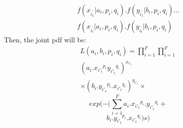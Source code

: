 \documentclass[]{article}
\begin{document}
\begin{multline*}
f({{x_{i_{1}^{'}}}|a_i,p_i,q_i}).f({{y_{i_{1}^{'}}}|b_i,p_i,q_i}){\dots}\\f({{x_{i_{t}^{'}}}|a_i,p_i,q_i}).f({{y_{i_{t}^{'}}}|b_i,p_i,q_i})
    \end{multline*}
Then, the joint pdf will be:
\begin{multline*}\label{e7}
     L(a_i,b_i,p_i,q_i)=
     {\prod_{i=1}^{F}}{\prod_{i=1}^{F}}\\(a_i.{x_{i'_t}}^{p_i}{y_{i'_t}}^{q_i})^{\Dot{x}_{i'_t}}\\{\times}(b_i.{y_{i'_t}}^{p_i}.{x_{i'_t}}^{q_i})^{\Dot{y}_{i'_t}}{\times}
      \nonumber
\end{multline*}
\begin{equation}
    exp(-(\sum_{i=1}^{F}a_i.{x_{i'_t}}^{p_i}.{y_{i'_t}}^{q_i}+
    \nonumber
\end{equation}
\begin{equation}
   b_i.{y_{i'_t}}^{p_i}.{x_{i'_t}}^{q_i})s)
\end{equation}
    
\end{document}
